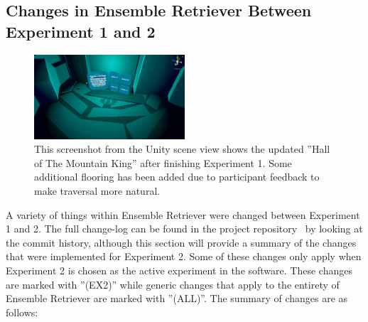 \subsection{Changes in Ensemble Retriever Between Experiment 1 and 2}\label{sec:changesBetweenExperiments}
\begin{figure}[tbph]
    \centering
    \includegraphics[width=0.5\textwidth]{figures/screenshots/HallOfTheMountainKingWithNewFloor.png}
    \caption[Screenshot of the ''Hall of The Mountain King'' Post Experiment 1]{This screenshot from the Unity scene view shows the updated ''Hall of The Mountain King'' after finishing Experiment 1. Some additional flooring has been added due to participant feedback to make traversal more natural.}
    \label{fig:mkhallWithFloor}
\end{figure}

A variety of things within Ensemble Retriever were changed between Experiment 1 and 2. The full change-log can be found in the project repository~\cite{projectRepository} by looking at the commit history, although this section will provide a summary of the changes that were implemented for Experiment 2. Some of these changes only apply when Experiment 2 is chosen as the active experiment in the software. These changes are marked with ''(EX2)'' while generic changes that apply to the entirety of Ensemble Retriever are marked with ''(ALL)''. The summary of changes are as follows:

